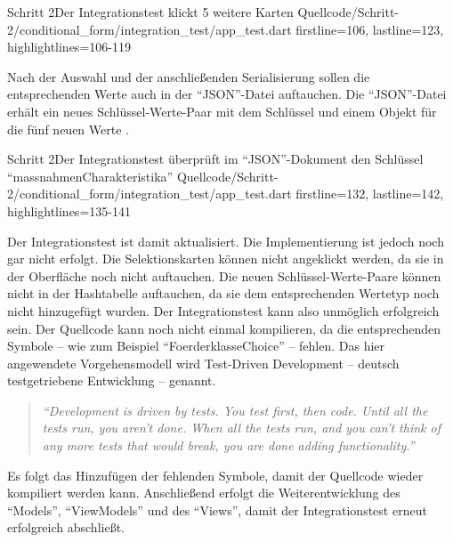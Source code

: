 \begin{alexlisting}{Schritt 2}{Der Integrationstest klickt 5 weitere Karten}
  {Quellcode/Schritt-2/conditional_form/integration_test/app_test.dart}
  {firstline=106, lastline=123, highlightlines={106-119}}
  \label{lst:Schritt2IntegrationstestKlickt5WeitereKarten}
\end{alexlisting}

\clearpage
Nach der Auswahl und der anschließenden Serialisierung sollen die entsprechenden Werte auch in der \enquote{JSON}-Datei auftauchen.
Die \enquote{JSON}-Datei erhält ein neues Schlüssel-Werte-Paar mit dem Schlüssel  und einem Objekt für die fünf neuen Werte .

\begin{alexlisting}{Schritt 2}{Der Integrationstest überprüft im \enquote{JSON}-Dokument den Schlüssel \enquote{massnahmenCharakteristika}}
  {Quellcode/Schritt-2/conditional_form/integration_test/app_test.dart}
  {firstline=132, lastline=142, highlightlines={135-141}}
  \label{lst:Schritt2ExpectedJson}
\end{alexlisting}

Der Integrationstest ist damit aktualisiert.
Die Implementierung ist jedoch noch gar nicht erfolgt.
Die Selektionskarten können nicht angeklickt werden, da sie in der Oberfläche noch nicht auftauchen.
Die neuen Schlüssel-Werte-Paare können nicht in der Hashtabelle auftauchen, da sie dem entsprechenden Wertetyp noch nicht hinzugefügt wurden.
Der Integrationstest kann also unmöglich erfolgreich sein.
Der Quellcode kann noch nicht einmal kompilieren, da die entsprechenden Symbole -- wie zum Beispiel \enquote{FoerderklasseChoice} -- fehlen.
Das hier angewendete Vorgehensmodell wird Test-Driven Development -- deutsch testgetriebene Entwicklung -- genannt.
 


\begin{quotation}
\textit{\enquote{Development is driven by tests.
You test first, then code.
Until all the tests run, you aren't
done.
When all the tests run, and you can't think of any more tests that would break, you
are done adding functionality.}}


\end{quotation}

Es folgt das Hinzufügen der fehlenden Symbole, damit der Quellcode wieder kompiliert werden kann.
Anschließend erfolgt die Weiterentwicklung des \enquote{Models}, \enquote{ViewModels} und des \enquote{Views}, damit der Integrationstest erneut erfolgreich abschließt.


